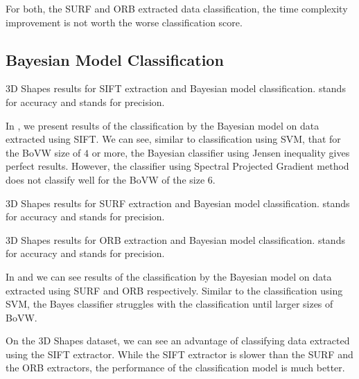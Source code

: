 For both, the SURF and ORB extracted data classification, the time complexity improvement is not worth the worse classification score.

\subsection{Bayesian Model Classification}
\begin{table}[ht!]
    \centering
    
    \caption[3D Shapes results for SIFT extraction and Bayesian model classification]{3D Shapes results for SIFT extraction and Bayesian model classification.  stands for accuracy and  stands for precision.}
    \label{tab:3d_SIFT_bayes}
\end{table}
In , we present results of the classification by the Bayesian model on data extracted using SIFT. We can see, similar to classification using SVM, that for the BoVW size of $4$ or more, the Bayesian classifier using Jensen inequality gives perfect results. However, the classifier using Spectral Projected Gradient method does not classify well for the BoVW of the size $6$.

\begin{table}[ht!]
    \centering
    
    \caption[3D Shapes results for SURF extraction and Bayesian model classification]{3D Shapes results for SURF extraction and Bayesian model classification.  stands for accuracy and  stands for precision.}
    \label{tab:3d_SURF_bayes}
\end{table}
\begin{table}[ht!]
    \centering
    
    \caption[3D Shapes results for ORB extraction and Bayesian model classification]{3D Shapes results for ORB extraction and Bayesian model classification.  stands for accuracy and  stands for precision.}
    \label{tab:3d_ORB_bayes}
\end{table}
In  and  we can see results of the classification by the Bayesian model on data extracted using SURF and ORB respectively. Similar to the classification using SVM, the Bayes classifier struggles with the classification until larger sizes of BoVW.

On the 3D Shapes dataset, we can see an advantage of classifying data extracted using the SIFT extractor. While the SIFT extractor is slower than the SURF and the ORB extractors, the performance of the classification model is much better.

